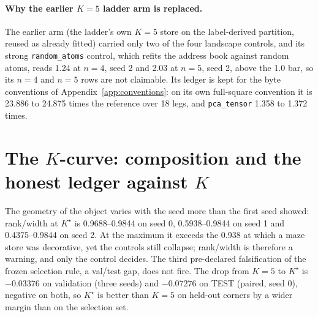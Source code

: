 \documentclass{article} %
\newcommand{\Kstar}{\ensuremath{K^{\star}}}
\begin{document}
\paragraph{Why the earlier $K=5$ ladder arm is replaced.} The earlier arm (the ladder's own
$K=5$ store on the label-derived partition, reused as already fitted) carried only two of the four
landscape controls, and its strong \texttt{random\_atoms} control, which refits the address book
against random atoms, reads 1.24 at $n=4$, seed 2 and 2.03 at $n=5$, seed 2, above the 1.0 bar, so %
its $n=4$ and $n=5$ rows are not claimable. Its ledger is kept for the byte conventions of
Appendix~\ref{app:conventions}: on its own full-square convention it is 23.886 to 24.875 times the %
reference over 18 legs, and \texttt{pca\_tensor} 1.358 to 1.372 times. %
\section{The $K$-curve: composition and the honest ledger against $K$}
\label{app:kcurve}

The geometry of the object varies with the seed more than the first seed showed:
rank/width at $\Kstar$ is 0.9688--0.9844 on seed 0, 0.5938--0.9844 on seed 1 and
0.4375--0.9844 on seed 2. At the maximum it exceeds the 0.938 at which a maze store was
decorative, yet the controls still collapse; rank/width is therefore a warning, and only the
control decides. %
The third pre-declared falsification of the frozen selection rule, a val/test gap, does not fire.
The drop from $K=5$ to $\Kstar$ is $-0.03376$ on validation (three seeds) and $-0.07276$ on
TEST (paired, seed 0), negative on both, so $\Kstar$ is better than $K=5$ on held-out corners
by a wider margin than on the selection set. %
\end{document}
